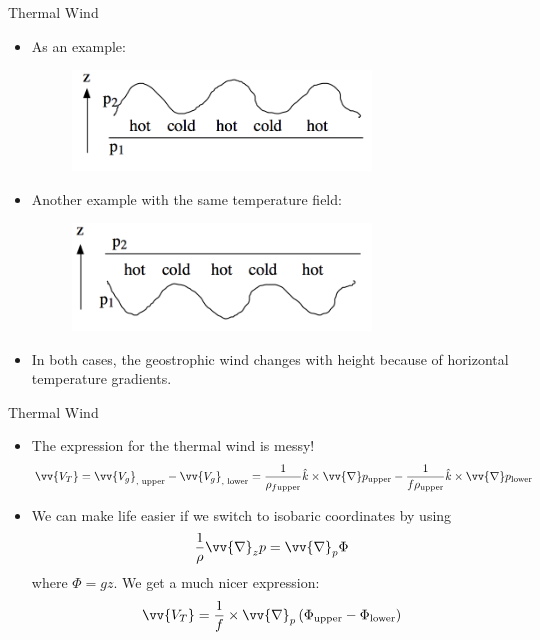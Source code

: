 \begin{frame}{Thermal Wind}

\begin{itemize}
	\item As an example:
	\begin{figure}
		\includegraphics[width=0.75\textwidth]{thermal1}
	\end{figure}
	\item Another example with the same temperature field:
	\begin{figure}
		\includegraphics[width=0.75\textwidth]{thermal2}
	\end{figure}
	\item In both cases, the geostrophic wind changes with height because of horizontal temperature gradients.
\end{itemize}
\end{frame}
\begin{frame}{Thermal Wind}

\begin{itemize}
	\item The expression for the thermal wind is messy!
	$$\vv{V_T} = \vv{V_g}_{\text{, upper}} -  \vv{V_g}_{\text{, lower}} = \frac{1}{\rho_{f \text{upper}}}\hat k \times \vv{\nabla} p_{\text{upper}} - \frac{1}{f \rho_{\text{upper}}}\hat k \times \vv{\nabla} p_{\text{lower}}$$
	\item We can make life easier if we switch to isobaric coordinates by using
	$$\frac{1}{\rho}\vv{\nabla}_z p = \vv{\nabla}_p \Phi$$
	where $\Phi = gz$. We get a much nicer expression:
	$$\vv{V_T} = \frac{1}{f} \times \vv{\nabla}_p \left(\Phi_{\text{upper}} - \Phi_{\text{lower}}\right)$$
\end{itemize}
\end{frame}
